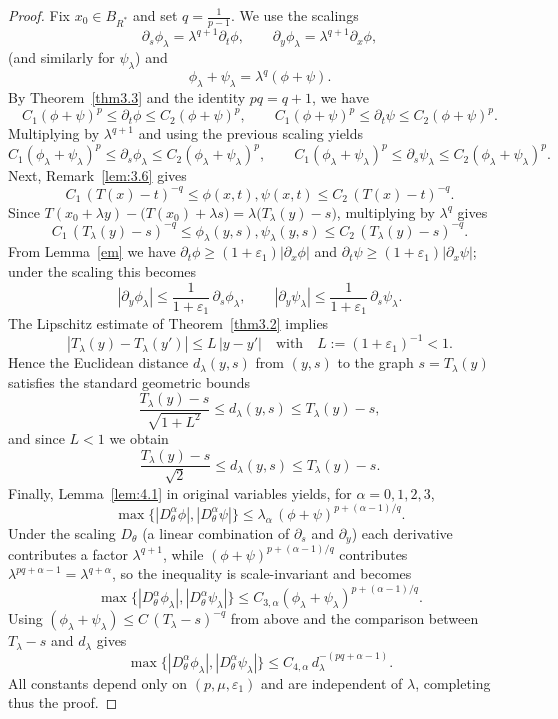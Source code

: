 \documentclass[
  sn-mathphys-num,
  colorlinks,
  linkcolor=darkmagenta,
  citecolor=rufous,
  urlcolor=zaffre,
  hypertexnames=false
]{sn-jnl}
\numberwithin{equation}{section}
\begin{document}
\begin{proof}
Fix $x_0\in B_{R^*}$ and set $q=\frac{1}{p-1}$. 
We use the scalings
$$
\partial_s\phi_\lambda=\lambda^{q+1}\partial_t\phi,\qquad 
\partial_y\phi_\lambda=\lambda^{q+1}\partial_x\phi,
$$
(and similarly for $\psi_\lambda$) and
$$
\phi_\lambda+\psi_\lambda=\lambda^{q}(\phi+\psi).
$$
By Theorem~\ref{thm3.3} and the identity $pq=q+1$, we have
$$
C_1(\phi+\psi)^p\le\partial_t\phi\le C_2(\phi+\psi)^p,
\qquad
C_1(\phi+\psi)^p\le\partial_t\psi\le C_2(\phi+\psi)^p.
$$
Multiplying by $\lambda^{q+1}$ and using the previous scaling yields
$$
C_1(\phi_\lambda+\psi_\lambda)^p\le\partial_s\phi_\lambda\le C_2(\phi_\lambda+\psi_\lambda)^p,
\qquad
C_1(\phi_\lambda+\psi_\lambda)^p\le\partial_s\psi_\lambda\le C_2(\phi_\lambda+\psi_\lambda)^p.
$$
Next, Remark~\ref{lem:3.6} gives
$$
C_1\,(T(x)-t)^{-q}\le \phi(x,t),\psi(x,t)\le C_2\,(T(x)-t)^{-q}.
$$
Since $T(x_0+\lambda y)-\big(T(x_0)+\lambda s\big)=\lambda\big(T_\lambda(y)-s\big)$, multiplying by $\lambda^{q}$ gives
$$
C_1\,(T_\lambda(y)-s)^{-q}\le \phi_\lambda(y,s),\psi_\lambda(y,s)\le C_2\,(T_\lambda(y)-s)^{-q}.
$$
From Lemma~\ref{em} we have $\partial_t\phi\ge(1+\varepsilon_1)|\partial_x\phi|$ and $\partial_t\psi\ge(1+\varepsilon_1)|\partial_x\psi|$; 
under the scaling this becomes
$$
|\partial_y\phi_\lambda|\le\frac{1}{1+\varepsilon_1}\,\partial_s\phi_\lambda,
\qquad
|\partial_y\psi_\lambda|\le\frac{1}{1+\varepsilon_1}\,\partial_s\psi_\lambda.
$$
The Lipschitz estimate of Theorem~\ref{thm3.2} implies 
$$
|T_\lambda(y)-T_\lambda(y')|\le L\,|y-y'|
\quad\text{with}\quad 
L:=(1+\varepsilon_1)^{-1}<1.
$$
Hence the Euclidean distance $d_\lambda(y,s)$ from $(y,s)$ to the graph $s=T_\lambda(y)$ satisfies the standard geometric bounds
$$
\frac{T_\lambda(y)-s}{\sqrt{1+L^2}}\le d_\lambda(y,s)\le T_\lambda(y)-s,
$$
and since $L<1$ we obtain
$$
\frac{T_\lambda(y)-s}{\sqrt{2}}\le d_\lambda(y,s)\le T_\lambda(y)-s.
$$
Finally, Lemma~\ref{lem:4.1} in original variables yields, for $\alpha=0,1,2,3$,
$$
\max\{|D_\theta^\alpha\phi|,|D_\theta^\alpha\psi|\}\le \lambda_\alpha\,(\phi+\psi)^{p+(\alpha-1)/q}.
$$
Under the scaling $D_\theta$ (a linear combination of $\partial_s$ and $\partial_y$) each derivative contributes a factor $\lambda^{q+1}$, while 
$(\phi+\psi)^{p+(\alpha-1)/q}$ contributes $\lambda^{pq+\alpha-1}=\lambda^{q+\alpha}$, so the inequality is scale-invariant and becomes
$$
\max\{|D_\theta^\alpha\phi_\lambda|,|D_\theta^\alpha\psi_\lambda|\}\le C_{3,\alpha}(\phi_\lambda+\psi_\lambda)^{p+(\alpha-1)/q}.
$$
Using $(\phi_\lambda+\psi_\lambda)\le C\,(T_\lambda-s)^{-q}$ from above and the comparison between $T_\lambda-s$ and $d_\lambda$ gives
$$
\max\{|D_\theta^\alpha\phi_\lambda|,|D_\theta^\alpha\psi_\lambda|\}\le C_{4,\alpha}\,d_\lambda^{-(pq+\alpha-1)}.
$$
All constants depend only on $(p,\mu,\varepsilon_1)$ and are independent of $\lambda$, completing thus the proof.
\end{proof}
\end{document}
